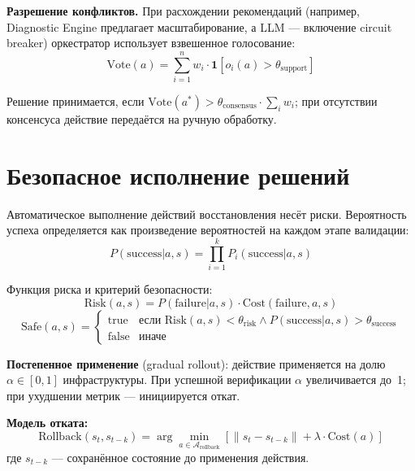 \textbf{Разрешение конфликтов.} При расхождении рекомендаций (например, Diagnostic Engine предлагает масштабирование, а LLM --- включение circuit breaker) оркестратор использует взвешенное голосование:
\begin{equation}
\text{Vote}(a) = \sum_{i=1}^{n} w_i \cdot \mathbf{1}[o_i(a) > \theta_{\text{support}}]
\label{eq:weighted_voting}
\end{equation}

Решение принимается, если $\text{Vote}(a^*) > \theta_{\text{consensus}} \cdot \sum_i w_i$; при отсутствии консенсуса действие передаётся на ручную обработку.

\section{Безопасное исполнение решений}

Автоматическое выполнение действий восстановления несёт риски. Вероятность успеха определяется как произведение вероятностей на каждом этапе валидации:
\begin{equation}
P(\text{success}|a, s) = \prod_{i=1}^{k} P_i(\text{success}|a, s)
\label{eq:success_probability}
\end{equation}

Функция риска и критерий безопасности:
\begin{equation}
\text{Risk}(a, s) = P(\text{failure}|a, s) \cdot \text{Cost}(\text{failure}, a, s)
\label{eq:risk_function}
\end{equation}
\begin{equation}
\text{Safe}(a, s) = \begin{cases}
\text{true} & \text{если } \text{Risk}(a, s) < \theta_{\text{risk}} \land P(\text{success}|a, s) > \theta_{\text{success}} \\
\text{false} & \text{иначе}
\end{cases}
\label{eq:safety_criterion}
\end{equation}

\textbf{Постепенное применение} (gradual rollout): действие применяется на долю $\alpha \in [0,1]$ инфраструктуры. При успешной верификации $\alpha$ увеличивается до~1; при ухудшении метрик --- инициируется откат.

\textbf{Модель отката:}
\begin{equation}
\text{Rollback}(s_t, s_{t-k}) = \arg\min_{a \in \mathcal{A}_{\text{rollback}}} \left[ \|s_t - s_{t-k}\| + \lambda \cdot \text{Cost}(a) \right]
\label{eq:rollback_model}
\end{equation}
где $s_{t-k}$ --- сохранённое состояние до применения действия.

